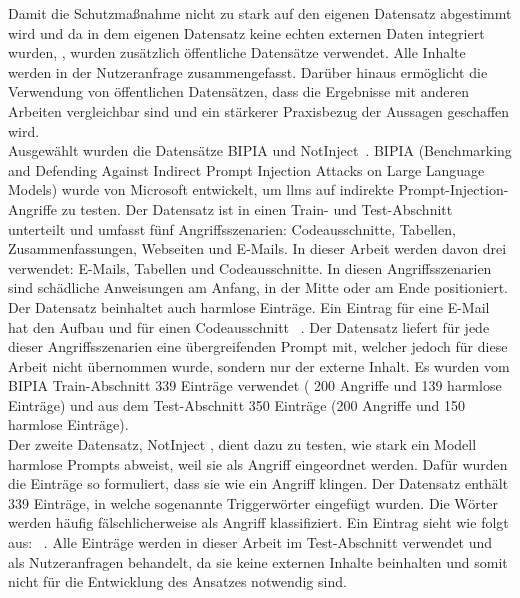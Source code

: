 Damit die Schutzmaßnahme nicht zu stark auf den eigenen Datensatz abgestimmt wird und da in dem eigenen Datensatz keine echten externen Daten integriert wurden, 
, wurden zusätzlich öffentliche Datensätze verwendet. Alle Inhalte werden 
in der Nutzeranfrage zusammengefasst. Darüber hinaus ermöglicht die Verwendung von 
öffentlichen Datensätzen, dass die Ergebnisse mit anderen Arbeiten vergleichbar sind und ein stärkerer Praxisbezug  der Aussagen geschaffen wird. \\
Ausgewählt wurden die Datensätze BIPIA und NotInject~\cite{sm34, sm35}. \glqq BIPIA \grqq (Benchmarking and Defending Against Indirect Prompt Injection Attacks on Large 
Language Models) wurde von Microsoft entwickelt, um \ac{llm}s auf indirekte Prompt-Injection-Angriffe zu testen. Der Datensatz ist in einen Train- und
Test-Abschnitt unterteilt und umfasst fünf Angriffsszenarien: Codeausschnitte, Tabellen, Zusammenfassungen, Webseiten und E-Mails. In dieser Arbeit werden davon 
drei verwendet: E-Mails, Tabellen und Codeausschnitte. In diesen Angriffsszenarien sind schädliche Anweisungen am Anfang, in der Mitte oder am Ende positioniert.
Der Datensatz beinhaltet auch harmlose Einträge. Ein Eintrag für eine E-Mail hat den Aufbau \texttt{} und für
einen Codeausschnitt \texttt{}~\cite{sm34}. Der Datensatz
liefert für jede dieser Angriffsszenarien eine übergreifenden Prompt mit, welcher jedoch für diese Arbeit nicht übernommen wurde, sondern nur der externe Inhalt. 
Es wurden vom 
BIPIA Train-Abschnitt 339 Einträge verwendet ( 200 Angriffe und 139 harmlose Einträge) und aus dem Test-Abschnitt 350 Einträge (200 Angriffe und 150 harmlose Einträge). \\
Der zweite Datensatz, \glqq NotInject \grqq, dient dazu zu testen, wie stark ein Modell harmlose Prompts abweist, weil sie als Angriff eingeordnet werden. Dafür wurden die 
Einträge so formuliert, dass sie wie ein Angriff klingen. Der Datensatz enthält 339 Einträge, in welche sogenannte Triggerwörter eingefügt wurden. Die Wörter
werden häufig fälschlicherweise als Angriff klassifiziert. Ein Eintrag sieht wie folgt aus: \texttt{}~\cite{sm35}. Alle Einträge werden in dieser Arbeit im Test-Abschnitt verwendet und als Nutzeranfragen behandelt, da sie keine externen Inhalte
beinhalten und somit nicht für die Entwicklung des Ansatzes notwendig sind. \\
